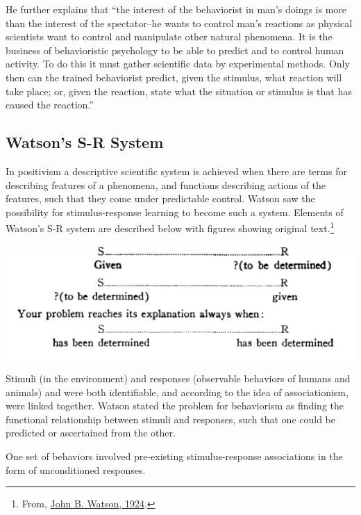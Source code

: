\documentclass[
  oneside,
  12pt]{crumpbook}
\newenvironment{floatrightbox50}{%
  \wrapfigure{R}{.5\textwidth}%
  }{%
  \endwrapfigure}
\begin{document}
He further explains that ``the interest of the behaviorist in man's doings is more than the interest of the spectator--he wants to control man's reactions as physical scientists want to control and manipulate other natural phenomena. It is the business of behavioristic psychology to be able to predict and to control human activity. To do this it must gather scientific data by experimental methods. Only then can the trained behaviorist predict, given the stimulus, what reaction will take place; or, given the reaction, state what the situation or stimulus is that has caused the reaction.''

\hypertarget{watsons-s-r-system}{%
\subsection{Watson's S-R System}\label{watsons-s-r-system}}

In positivism a descriptive scientific system is achieved when there are terms for describing features of a phenomena, and functions describing actions of the features, such that they come under predictable control. Watson saw the possibility for stimulus-response learning to become such a system. Elements of Watson's S-R system are described below with figures showing original text.\footnote{From, \protect\hyperlink{ref-watsonBehaviorism1924}{John B. Watson, 1924}.}

\begin{floatrightbox50}
\includegraphics[width=1\linewidth]{imgs/Watson_SR}

\end{floatrightbox50}

Stimuli (in the environment) and responses (observable behaviors of humans and animals) and were both identifiable, and according to the idea of associationism, were linked together. Watson stated the problem for behaviorism as finding the functional relationship between stimuli and responses, such that one could be predicted or ascertained from the other.

One set of behaviors involved pre-existing stimulus-response associations in the form of unconditioned responses.
\end{document}
